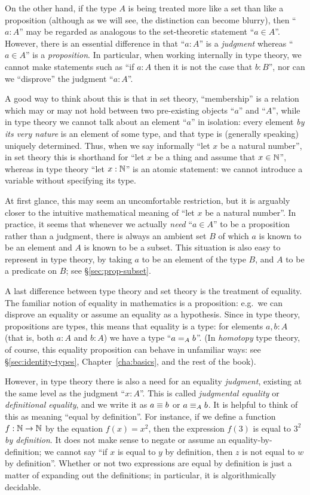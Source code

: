{On the other hand, if the type $A$ is being treated more like a set than like a proposition (although as we will see, the distinction can become blurry), then ``$a:A$'' may be regarded as analogous to the set-theoretic statement ``$a\in A$''.
However, there is an essential difference in that ``$a:A$'' is a \emph{judgment} whereas ``$a\in A$'' is a \emph{proposition}.
In particular, when working internally in type theory, we cannot make statements such as ``if $a:A$ then it is not the case that $b:B$'', nor can we ``disprove'' the judgment ``$a:A$''.

A good way to think about this is that in set theory, ``membership'' is a relation which may or may not hold between two pre-existing objects ``$a$'' and ``$A$'', while in type theory we cannot talk about an element ``$a$'' in isolation: every element \emph{by its very nature} is an element of some type, and that type is (generally speaking) uniquely determined.
Thus, when we say informally ``let $x$ be a natural number'', in set theory this is shorthand for ``let $x$ be a thing and assume that $x\in\nat$'', whereas in type theory ``let $x:\nat$'' is an atomic statement: we cannot introduce a variable without specifying its type.

At first glance, this may seem an uncomfortable restriction, but it is arguably closer to the intuitive mathematical meaning of ``let $x$ be a natural number''.
In practice, it seems that whenever we actually \emph{need} ``$a\in A$'' to be a proposition rather than a judgment, there is always an ambient set $B$ of which $a$ is known to be an element and $A$ is known to be a subset.
This situation is also easy to represent in type theory, by taking $a$ to be an element of the type $B$, and $A$ to be a predicate on $B$; see \S\ref{sec:prop-subset}.

A last difference between type theory and set theory is the treatment of equality.
The familiar notion of equality in mathematics is a proposition: e.g.\ we can disprove an equality or assume an equality as a hypothesis.
Since in type theory, propositions are types, this means that equality is a type: for elements $a,b:A$ (that is, both $a:A$ and $b:A$) we have a type ``$\id[A]ab$''.
(In \emph{homotopy} type theory, of course, this equality proposition can behave in unfamiliar ways: see \S\ref{sec:identity-types}, Chapter~\ref{cha:basics}, and the rest of the book).

However, in type theory there is also a need for an equality \emph{judgment}, existing at the same level as the judgment ``$x:A$''.
This is called \emph{judgmental equality} or \emph{definitional equality}, and we write it as $a\jdeq b$ or $a \jdeq_A b$.
It is helpful to think of this as meaning ``equal by definition''.
For instance, if we define a function $f:\nat\to\nat$ by the equation $f(x)=x^2$, then the expression $f(3)$ is equal to $3^2$ \emph{by definition}.
It does not make sense to negate or assume an equality-by-definition; we cannot say ``if $x$ is equal to $y$ by definition, then $z$ is not equal to $w$ by definition''.
Whether or not two expressions are equal by definition is just a matter of expanding out the definitions; in particular, it is algorithmically decidable.

}
